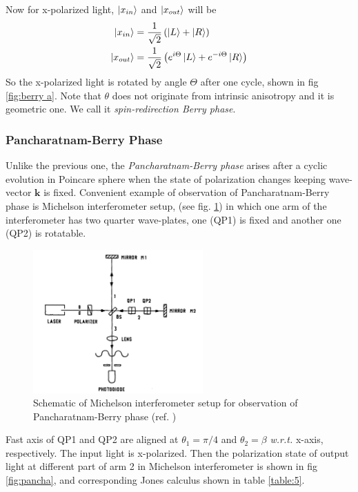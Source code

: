 \documentclass[11pt,a4paper]{article}
\numberwithin{equation}{section}
\begin{document}
Now for x-polarized light, $\ket{x_{in}}$ and $\ket{x_{out}}$ will be
\begin{align}
	\ket{x_{in}} &= \frac{1}{\sqrt{2}}\left(\ket{L}+\ket{R}\right)\\
	\ket{x_{out}} &= \frac{1}{\sqrt{2}}\left(e^{i\Theta}\ket{L}+ e^{-i\Theta}\ket{R}\right)
\end{align} So the x-polarized light is rotated by angle $\Theta$ after one cycle, shown in fig \ref{fig:berry a}. Note that $\theta$ does not originate from intrinsic anisotropy and it is geometric one. We call it \textit{spin-redirection Berry phase}.

\subsubsection{Pancharatnam-Berry Phase}
Unlike the previous one, the \textit{Pancharatnam-Berry phase} arises after a cyclic evolution in Poincare sphere when the state of polarization changes  keeping wave-vector $\boldsymbol{k}$ is fixed. Convenient example of observation of Pancharatnam-Berry phase is Michelson interferometer setup, (see fig. \ref{fig:pb expt}) in which one arm of the interferometer has two quarter wave-plates, one (QP1) is fixed and another one (QP2) is rotatable. \cite{chyba 88}

\begin{figure}[H]
	\centering
	\includegraphics[width=6.5cm]{pb expt.png}
	\caption{Schematic of Michelson interferometer setup for observation of Pancharatnam-Berry phase (ref. \cite{chyba 88})}
	\label{fig:pb expt}
\end{figure}

 Fast axis of QP1 and QP2 are aligned at $\theta_1= \pi/4$ and $\theta_2= \beta$ \textit{w.r.t.} x-axis, respectively. The input light is x-polarized. Then the polarization state of output light at different part of arm 2 in Michelson interferometer is shown in fig \ref{fig:pancha}, and corresponding Jones calculus shown in table \ref{table:5}.
 
\end{document}
